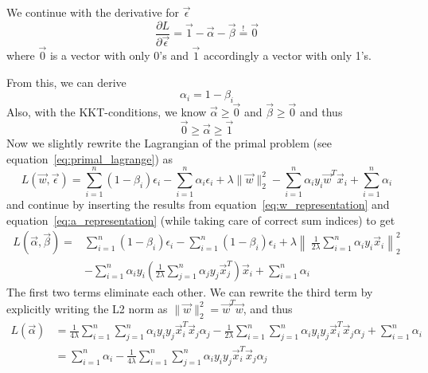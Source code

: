 \documentclass[a4paper]{article}
\begin{document}
We continue with the derivative for $\vec{\epsilon}$
\begin{equation*}
    \frac{\partial L}{\partial\vec{\epsilon}} =
    \vec{1} - \vec{\alpha} - \vec{\beta} \stackrel{!}{=} \vec{0}
\end{equation*}
where $\vec{0}$ is a vector with only 0's and $\vec{1}$ accordingly a vector
with only 1's.

From this, we can derive
\begin{equation}\label{eq:a_representation}
    \alpha_i = 1 - \beta_i
\end{equation}
Also, with the KKT-conditions, we know $\vec{\alpha}\geq\vec{0}$ and
$\vec{\beta}\geq\vec{0}$ and thus
\begin{equation}\label{eq:a_condition}
    \vec{0} \geq \vec{\alpha} \geq \vec{1}
\end{equation}
Now we slightly rewrite the Lagrangian of the primal problem (see
equation~\ref{eq:primal_lagrange}) as
\begin{equation*}
    L(\vec{w}, \vec{\epsilon}) =
    \sum_{i=1}^{n}(1-\beta_i)\epsilon_i
    - \sum_{i=1}^{n}\alpha_i\epsilon_i
    + \lambda\rVert\vec{w}\lVert_2^2
    - \sum_{i=1}^{n}\alpha_iy_i\vec{w}^T\vec{x}_i
    + \sum_{i=1}^{n}\alpha_i
\end{equation*}
and continue by inserting the results from equation~\ref{eq:w_representation}
and equation~\ref{eq:a_representation} (while taking care of correct sum
indices) to get
\begin{equation*}
\begin{split}
    L(\vec{\alpha}, \vec{\beta}) =
    &\sum_{i=1}^{n}(1-\beta_i)\epsilon_i
    - \sum_{i=1}^{n}(1-\beta_i)\epsilon_i
    + \lambda\left\rVert\
        \frac{1}{2\lambda}\sum_{i=1}^{n}\alpha_iy_i\vec{x}_i
    \right\lVert_2^2\\
    &- \sum_{i=1}^{n}\alpha_iy_i
    \left(\frac{1}{2\lambda}
        \sum_{j=1}^{n}\alpha_jy_j\vec{x}_j^T
    \right)\vec{x}_i
    + \sum_{i=1}^{n}\alpha_i
\end{split}
\end{equation*}
The first two terms eliminate each other. We can rewrite the third term by
explicitly writing the L2 norm as $\lVert\vec{w}\rVert_2^2=\vec{w}^T\vec{w}$,
and thus
\begin{equation*}
\begin{split}
    L(\vec{\alpha}) &= \frac{1}{4\lambda}
    \sum_{i=1}^{n}\sum_{j=1}^{n}\alpha_iy_iy_j\vec{x}_i^T\vec{x}_j\alpha_j
    - \frac{1}{2\lambda}
    \sum_{i=1}^{n}\sum_{j=1}^{n}\alpha_iy_iy_j\vec{x}_i^T\vec{x}_j\alpha_j
    + \sum_{i=1}^{n}\alpha_i\\
    &= \sum_{i=1}^{n}\alpha_i
    - \frac{1}{4\lambda}
    \sum_{i=1}^{n}\sum_{j=1}^{n}\alpha_iy_iy_j\vec{x}_i^T\vec{x}_j\alpha_j
\end{split}
\end{equation*}
\end{document}
